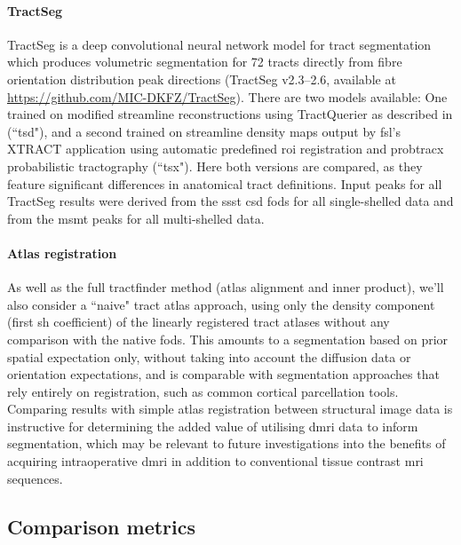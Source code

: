 \paragraph*{TractSeg}

TractSeg \autocite{Wasserthal2018} is a deep convolutional neural network model for tract segmentation which produces volumetric segmentation for 72 tracts directly from fibre orientation distribution peak directions (TractSeg v2.3--2.6, available at \url{https://github.com/MIC-DKFZ/TractSeg}).
There are two models available: One trained on modified streamline reconstructions using TractQuerier \autocite{Wassermann2016} as described in \textcite{Wasserthal2018} (``\gls{tsd}"), and a second trained on streamline density maps output by \gls{fsl}'s XTRACT \autocite{Warrington2020} application using automatic predefined \gls{roi} registration and probtracx probabilistic tractography\autocite{Behrens2007} (``\gls{tsx}").
Here both versions are compared, as they feature significant differences in anatomical tract definitions.
Input peaks for all TractSeg results were derived from the \gls{ssst} \gls{csd} \glspl{fod} for all single-shelled data and from the \gls{msmt} peaks for all multi-shelled data.

\paragraph*{Atlas registration}

As well as the full tractfinder method (atlas alignment and inner product), we'll also consider a ``naive" tract atlas approach, using only the density component (first \gls{sh} coefficient) of the linearly registered tract atlases without any comparison with the native \glspl{fod}.
This amounts to a segmentation based on prior spatial expectation only, without taking into account the diffusion data or orientation expectations, and is comparable with segmentation approaches that rely entirely on registration, such as common cortical parcellation tools.
Comparing results with simple atlas registration between structural image data is instructive for determining the added value of utilising \gls{dmri} data to inform segmentation, which may be relevant to future investigations into the benefits of acquiring intraoperative \gls{dmri} in addition to conventional tissue contrast \gls{mri} sequences.

\subsection{Comparison metrics}

